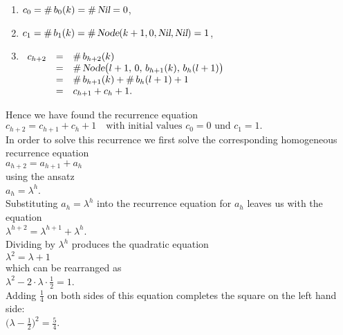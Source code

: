 \begin{enumerate}
\item $c_0 = \#\, b_0(k) = \#\, \textsl{Nil} = 0$,
\item $c_1 = \#\, b_1(k) = \#\, \textsl{Node}(k+1,0,\textsl{Nil}, \textsl{Nil}) = 1$, 
\item$\begin{array}[t]{lcl}
       c_{h+2} & = & \#\, b_{h+2}(k) \\
               & = & \#\,\textsl{Node}\bigl(l+1,\,0,\,b_{h+1}(k),\,b_h(l+1)\bigr) \\
               & = & \#\, b_{h+1}(k) + \#\, b_h(l+1) + 1 \\
               & = & c_{h+1} + c_h + 1.
       \end{array}$
\end{enumerate}
Hence we have found the recurrence equation 
\\[0.2cm]
\hspace*{1.3cm}
$c_{h+2} = c_{h+1} + c_h + 1 \quad \mbox{with initial values $c_0 = 0$ und $c_1 = 1$}.$
\\[0.2cm]
In order to solve this recurrence we first solve the corresponding homogeneous recurrence equation
\\[0.2cm]
\hspace*{1.3cm}
$a_{h+2} = a_{h+1} + a_h$
\\[0.2cm]
using the  ansatz
\\[0.2cm]
\hspace*{1.3cm}
$a_h = \lambda^h$.
\\[0.2cm]
Substituting $a_h = \lambda^h$ into the recurrence equation for $a_h$ leaves us with the equation
\\[0.2cm]
\hspace*{1.3cm}
$\lambda^{h+2} = \lambda^{h+1} + \lambda^{h}$.
\\[0.2cm]
Dividing by $\lambda^h$ produces the quadratic equation
\\[0.2cm]
\hspace*{1.3cm}
$\lambda^2 = \lambda + 1$
\\[0.2cm]
which can be rearranged as
\\[0.2cm]
\hspace*{1.3cm}
$\lambda^2 - 2 \cdot \lambda \cdot \frac{1}{2} = 1$.
\\[0.2cm]
Adding $\frac{1}{4}$ on both sides of this equation completes the square on the left hand side:
\\[0.2cm]
\hspace*{1.3cm}
$\bigl(\lambda - \frac{1}{2}\bigr)^2 = \frac{5}{4}$. 
